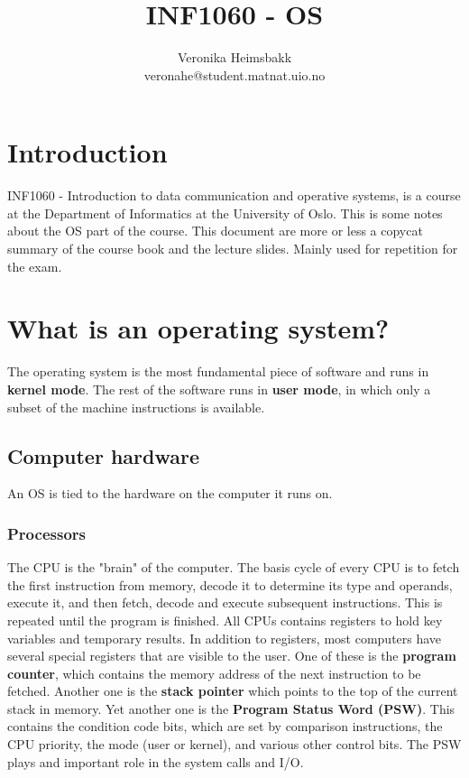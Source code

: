 \documentclass[11pt,a4paper]{article}
\title{INF1060 - OS}
\author{Veronika Heimsbakk \\ 
veronahe@student.matnat.uio.no}
\begin{document}
\maketitle{}
\tableofcontents
\newpage{}

\section{Introduction}
INF1060 - Introduction to data communication and operative systems, is a course at the Department of Informatics at the University of Oslo. This is some notes about the OS part of the course. This document are more or less a copycat summary of the course book and the lecture slides. Mainly used for repetition for the exam.

\section{What is an operating system?}
The operating system is the most fundamental piece of software and runs in \textbf{kernel mode}. The rest of the software runs in \textbf{user mode}, in which only a subset of the machine instructions is available. 

\subsection{Computer hardware}
An OS is tied to the hardware on the computer it runs on. 

\subsubsection{Processors}
The CPU is the "brain" of the computer. The basis cycle of every CPU is to fetch the first instruction from memory, decode it to determine its type and operands, execute it, and then fetch, decode and execute subsequent instructions. This is repeated until the program is finished. All CPUs contains registers to hold key variables and temporary results. In addition to registers, most computers have several special registers that are visible to the user. One of these is the \textbf{program counter}, which contains the memory address of the next instruction to be fetched. Another one is the \textbf{stack pointer} which points to the top of the current stack in memory. Yet another one is the \textbf{Program Status Word (PSW)}. This contains the condition code bits, which are set by comparison instructions, the CPU priority, the mode (user or kernel), and various other control bits. The PSW plays and important role in the system calls and I/O.
\end{document}
